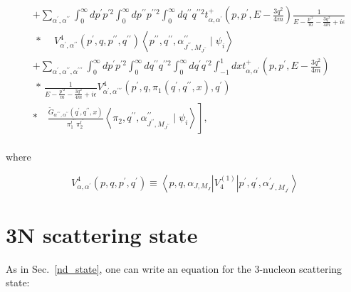 \begin{equation}
\begin{aligned}
        & +\sum_{\alpha^{\prime}, \alpha^{\prime \prime}} \int_0^{\infty} d p^{\prime} p^{\prime 2} \int_0^{\infty} d p^{\prime \prime} p^{\prime \prime 2} \int_0^{\infty} d q^{\prime \prime} q^{\prime \prime 2} t_{\alpha, \alpha^{\prime}}^{+}\left(p, p^{\prime}, E-\frac{3 q^2}{4 m}\right) \frac{1}{E-\frac{p^{\prime 2}}{m}-\frac{3 q^2}{4 m}+i \epsilon} \\ & \text { * } \quad V_{\alpha^{\prime}, \alpha^{\prime \prime}}^4\left(p^{\prime}, q, p^{\prime \prime}, q^{\prime \prime}\right)\left\langle p^{\prime \prime}, q^{\prime \prime}, \alpha_{J^{\prime \prime}, M_{J^{\prime \prime}}}^{\prime \prime} \mid \psi_i\right\rangle \\ & +\sum_{\alpha^{\prime}, \alpha^{\prime \prime}, \alpha^{\prime \prime \prime}} \int_0^{\infty} d p^{\prime} p^{\prime 2} \int_0^{\infty} d q^{\prime \prime} q^{\prime \prime 2} \int_0^{\infty} d q^{\prime} q^{\prime 2} \int_{-1}^1 d x t_{\alpha, \alpha^{\prime}}^{+}\left(p, p^{\prime}, E-\frac{3 q^2}{4 m}\right) \\ & \text { * } \frac{1}{E-\frac{p^{\prime 2}}{m}-\frac{3 q^2}{4 m}+i \epsilon} V_{\alpha^{\prime}, \alpha^{\prime \prime \prime}}^4\left(p^{\prime}, q, \pi_1\left(q^{\prime}, q^{\prime \prime}, x\right), q^{\prime}\right) \\ & \left.* \quad \frac{\tilde{G}_{\alpha^{\prime \prime \prime}, \alpha^{\prime \prime}}\left(q^{\prime}, q^{\prime \prime}, x\right)}{\pi_1^{l^{\prime \prime \prime}} \pi_2^{l^{\prime \prime}}}\left\langle\pi_2, q^{\prime \prime}, \alpha_{J^{\prime \prime}, M_{J^{\prime \prime}}}^{\prime \prime} \mid \psi_i\right\rangle\right] \text {, } \\ & 
    \end{aligned}
\end{equation}

where

\begin{equation}
    V_{\alpha, \alpha^{\prime}}^4\left(p, q, p^{\prime}, q^{\prime}\right) \equiv\left\langle p, q, \alpha_{J, M_J}\left|V_4^{(1)}\right| p^{\prime}, q^{\prime}, \alpha_{J^{\prime}, M_{J^{\prime}}}^{\prime}\right\rangle
\end{equation}
    

\section{3N scattering state}

    As in Sec.~\ref{nd_state}, one can
    write an equation for the 3-nucleon scattering state:

